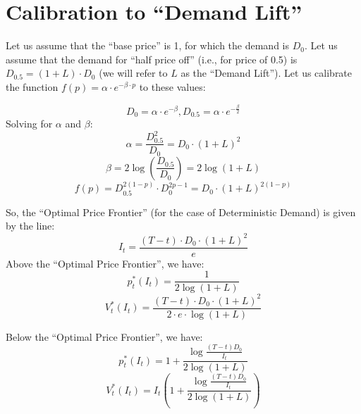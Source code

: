 \documentclass[12pt]{amsart}
\begin{document}
   
   \section{Calibration to ``Demand Lift''}
   
   Let us assume that the ``base price'' is 1, for which the demand is $D_0$. Let us assume that the demand for ``half price off'' (i.e., for price of 0.5) is $D_{0.5} = (1+L)\cdot D_0$ (we will refer to $L$ as the ``Demand Lift''). Let us calibrate the function $f(p) = \alpha \cdot e^{-\beta \cdot p}$ to these values:
   
$$D_0 = \alpha \cdot e^{-\beta}, D_{0.5} = \alpha \cdot e^{-\frac {\beta} 2}$$
Solving for $\alpha$ and $\beta$:
$$\alpha = \frac {D_{0.5}^2} {D_0} = D_0 \cdot (1+L)^2$$
$$\beta = 2 \log{(\frac {D_{0.5}} {D_0})} = 2 \log{(1 + L)}$$
$$f(p) = D_{0.5}^{2(1-p)} \cdot D_0^{2p-1} = D_0 \cdot (1+L)^{2(1-p)}$$

So, the ``Optimal Price Frontier'' (for the case of Deterministic Demand) is given by the line:
$$I_t = \frac {(T-t) \cdot D_0 \cdot (1+L)^2} {e}$$
Above the ``Optimal Price Frontier'', we have:
$$p_t^*(I_t) = \frac 1 {2 \log{(1+L)}}$$
$$V_t^*(I_t) = \frac {(T-t) \cdot D_0 \cdot (1+L)^2} {2 \cdot e \cdot \log{(1+L)}} $$

Below the ``Optimal Price Frontier'', we have:
$$p_t^*(I_t) = 1 + \frac {\log \frac {(T-t)D_0} {I_t}} {2 \log (1+L)}$$
$$V_t^*(I_t) = I_t(1 + \frac {\log \frac {(T-t)D_0} {I_t}} {2 \log (1+L)}) $$
   
     
   
\end{document}
